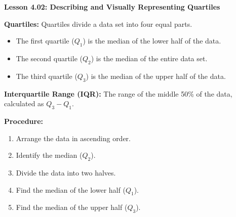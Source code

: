 \begin{center}
\textbf{Lesson 4.02: Describing and Visually Representing Quartiles}
\end{center}

\vspace*{-1.5ex}

\noindent \textbf{Quartiles:} Quartiles divide a data set into four equal parts.  
    \begin{itemize}
        \item The first quartile (\(Q_1\)) is the median of the lower half of the data.  
        \item The second quartile (\(Q_2\)) is the median of the entire data set.  
        \item The third quartile (\(Q_3\)) is the median of the upper half of the data.  
    \end{itemize}

\noindent \textbf{Interquartile Range (IQR):} The range of the middle 50\% of the data, calculated as \(Q_3 - Q_1\).

\noindent\textbf{Procedure:}  
\begin{enumerate}
    \item Arrange the data in ascending order.  
    \item Identify the median (\(Q_2\)).  
    \item Divide the data into two halves.
    \item Find the median of the lower half (\(Q_1\)).  
    \item Find the median of the upper half (\(Q_3\)).
\end{enumerate}
